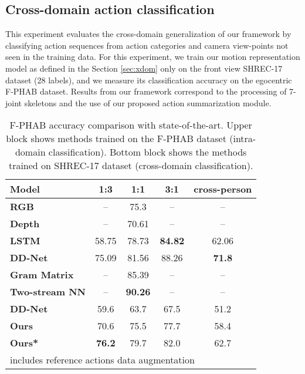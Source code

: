 \documentclass[letterpaper, 10 pt, conference]{ieeeconf}
\begin{document}
\subsection{Cross-domain action classification}
\label{sec:fphab_bench}

This experiment evaluates the cross-domain generalization of our framework by classifying action sequences from action categories and camera view-points not seen in the training data. 
For this experiment, we train our motion representation model as defined in the Section \ref{sec:xdom} only on the front view SHREC-17 dataset (28 labels), and we measure its classification accuracy on the egocentric F-PHAB dataset. Results from our framework correspond to the processing of 7-joint skeletons and the use of our proposed action summarization module.


\begin{table}[ht]
\centering
\begin{tabular}{|l|c|c|c|c|}
\hline
\textbf{Model} & \textbf{1:3} & \textbf{1:1} & \textbf{3:1} & \textbf{cross-person} \\ \hline
\textbf{RGB \cite{feichtenhofer2016convolutional}} & -- & 75.3 & -- & -- \\ \hline
\textbf{Depth \cite{oreifej2013hon4d}} & -- & 70.61 & -- & -- \\ \hline
\textbf{LSTM \cite{zhu2016co}} & 58.75 & 78.73 & \textbf{84.82} & 62.06 \\ \hline
\textbf{DD-Net \cite{yang2019make}} & 75.09 & 81.56 & 88.26 & \textbf{71.8} \\ \hline \textbf{Gram Matrix \cite{zhang2016efficient}} & -- & 85.39 & -- & -- \\ \hline
\textbf{Two-stream NN \cite{li2021two}} & -- & \textbf{90.26} & -- & -- \\ \hline\hline
\textbf{DD-Net \cite{yang2019make}} & 59.6 & 63.7 & 67.5 & 51.2 \\ \hline
\textbf{Ours} & 70.6 & 75.5 & 77.7 & 58.4 \\ \hline
\textbf{Ours*} & \textbf{76.2} & 79.7 & 82.0 & 62.7 \\ \hline
\multicolumn{5}{l}{\footnotesize  includes reference actions data augmentation} \\
\end{tabular}
\caption{F-PHAB accuracy comparison with state-of-the-art. Upper block shows methods trained on the F-PHAB dataset (intra-domain classification). Bottom block shows the methods trained on SHREC-17 dataset (cross-domain classification).}
\label{tab:phab_ablation}
\end{table}
\end{document}
